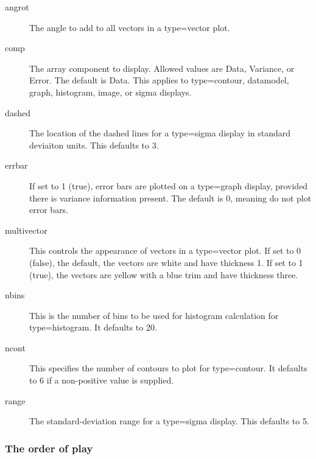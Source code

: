 \documentclass[twoside,11pt]{article}
\renewcommand{\_}{\texttt{\symbol{95}}}
\begin{document}
\begin{description}
\item[angrot] \mbox{}

The angle to add to all vectors in a type=vector plot.

\item[comp] \mbox{}

The array component to display.  Allowed values are Data, Variance, or
Error.  The default is Data.  This applies to type=contour, datamodel,
graph, histogram, image, or sigma displays.

\item[dashed] \mbox{}

The location of the dashed lines for a type=sigma display in standard
deviaiton units.  This defaults to 3.

\item[errbar] \mbox{}

If set to 1 (true), error bars are plotted on a type=graph display,
provided there is variance information present.  The default is 0,
meaning do not plot error bars.

\item[multivector] \mbox{}

This controls the appearance of vectors in a type=vector plot.
If set to 0 (false), the default, the vectors are white and have
thickness 1.  If set to 1 (true), the vectors are yellow with a blue
trim and have thickness three.

\item[nbins] \mbox{}

This is the number of bins to be used for histogram calculation for
type=histogram.  It defaults to 20.

\item[ncont] \mbox{}

This specifies the number of contours to plot for type=contour.
It defaults to 6 if a non-positive value is supplied.

\item[range] \mbox{}

The standard-deviation range for a type=sigma display.  This defaults
to 5.

\end{description}
\subsubsection*{The order of play\label{The_ORAC-DR_Display_System_The_order_of_play}}
\end{document}
